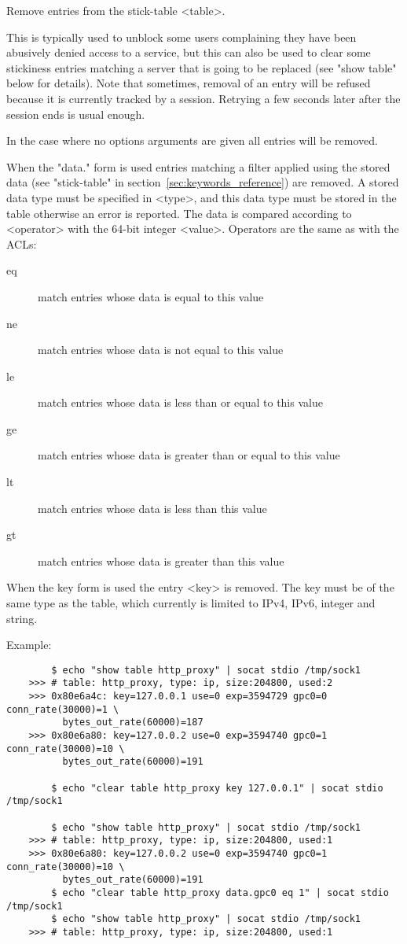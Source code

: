   Remove entries from the stick-table <table>.

  This is typically used to unblock some users complaining they have been
  abusively denied access to a service, but this can also be used to clear some
  stickiness entries matching a server that is going to be replaced (see "show
  table" below for details).  Note that sometimes, removal of an entry will be
  refused because it is currently tracked by a session. Retrying a few seconds
  later after the session ends is usual enough.

  In the case where no options arguments are given all entries will be removed.

  When the "data." form is used entries matching a filter applied using the
  stored data (see "stick-table" in section~\ref{sec:keywords_reference}) are removed.  A stored data
  type must be specified in <type>, and this data type must be stored in the
  table otherwise an error is reported. The data is compared according to
  <operator> with the 64-bit integer <value>.  Operators are the same as with
  the ACLs:
  
  \begin{description}
  \item[eq] match entries whose data is equal to this value
  \item[ne] match entries whose data is not equal to this value
  \item[le] match entries whose data is less than or equal to this value
  \item[ge] match entries whose data is greater than or equal to this value
  \item[lt] match entries whose data is less than this value
  \item[gt] match entries whose data is greater than this value
  \end{description}

  When the key form is used the entry <key> is removed.  The key must be of the
  same type as the table, which currently is limited to IPv4, IPv6, integer and
  string.

  Example:
  \begin{verbatim}
        $ echo "show table http_proxy" | socat stdio /tmp/sock1
    >>> # table: http_proxy, type: ip, size:204800, used:2
    >>> 0x80e6a4c: key=127.0.0.1 use=0 exp=3594729 gpc0=0 conn_rate(30000)=1 \
          bytes_out_rate(60000)=187
    >>> 0x80e6a80: key=127.0.0.2 use=0 exp=3594740 gpc0=1 conn_rate(30000)=10 \
          bytes_out_rate(60000)=191

        $ echo "clear table http_proxy key 127.0.0.1" | socat stdio /tmp/sock1

        $ echo "show table http_proxy" | socat stdio /tmp/sock1
    >>> # table: http_proxy, type: ip, size:204800, used:1
    >>> 0x80e6a80: key=127.0.0.2 use=0 exp=3594740 gpc0=1 conn_rate(30000)=10 \
          bytes_out_rate(60000)=191
        $ echo "clear table http_proxy data.gpc0 eq 1" | socat stdio /tmp/sock1
        $ echo "show table http_proxy" | socat stdio /tmp/sock1
    >>> # table: http_proxy, type: ip, size:204800, used:1
 \end{verbatim}


